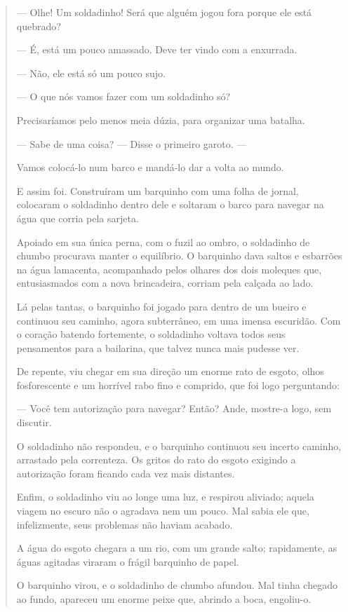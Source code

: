 \begin{itemize}
{{{\begin{itemize}
\begin{itemize}
\begin{itemize}
\begin{quote}
--- Olhe! Um soldadinho! Será que alguém jogou fora porque ele está
quebrado?

--- É, está um pouco amassado. Deve ter vindo com a enxurrada.

--- Não, ele está só um pouco sujo.

--- O que nós vamos fazer com um soldadinho só?

Precisaríamos pelo menos meia dúzia, para organizar uma batalha.

--- Sabe de uma coisa? --- Disse o primeiro garoto. ---

Vamos colocá-lo num barco e mandá-lo dar a volta ao mundo.

E assim foi. Construíram um barquinho com uma folha de jornal, colocaram
o soldadinho dentro dele e soltaram o barco para navegar na água que
corria pela sarjeta.

Apoiado em sua única perna, com o fuzil ao ombro, o soldadinho de chumbo
procurava manter o equilíbrio. O barquinho dava saltos e esbarrões na
água lamacenta, acompanhado pelos olhares dos dois moleques que,
entusiasmados com a nova brincadeira, corriam pela calçada ao lado.

Lá pelas tantas, o barquinho foi jogado para dentro de um bueiro e
continuou seu caminho, agora subterrâneo, em uma imensa escuridão. Com o
coração batendo fortemente, o soldadinho voltava todos seus pensamentos
para a bailarina, que talvez nunca mais pudesse ver.

De repente, viu chegar em sua direção um enorme rato de esgoto, olhos
fosforescente e um horrível rabo fino e comprido, que foi logo
perguntando:

--- Você tem autorização para navegar? Então? Ande, mostre-a logo, sem
discutir.

O soldadinho não respondeu, e o barquinho continuou seu incerto caminho,
arrastado pela correnteza. Os gritos do rato do esgoto exigindo a
autorização foram ficando cada vez mais distantes.

Enfim, o soldadinho viu ao longe uma luz, e respirou aliviado; aquela
viagem no escuro não o agradava nem um pouco. Mal sabia ele que,
infelizmente, seus problemas não haviam acabado.

A água do esgoto chegara a um rio, com um grande salto; rapidamente, as
águas agitadas viraram o frágil barquinho de papel.

O barquinho virou, e o soldadinho de chumbo afundou. Mal tinha chegado
ao fundo, apareceu um enorme peixe que, abrindo a boca, engoliu-o.


\end{quote}
\end{itemize}
\end{itemize}
\end{itemize}}}}
\end{itemize}
